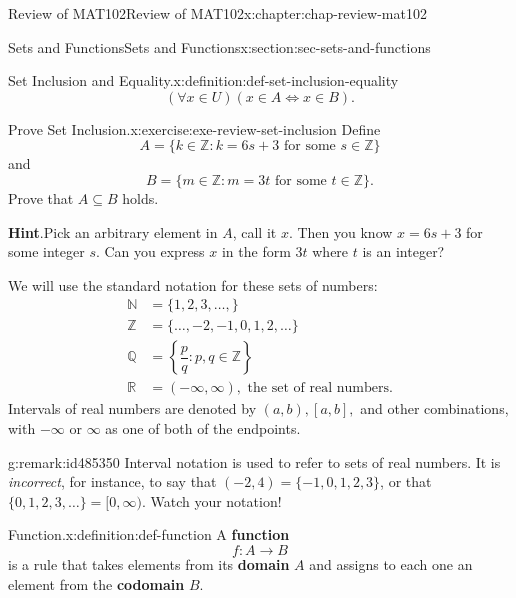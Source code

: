 \documentclass[oneside,10pt,]{book}
\newcommand{\blocktitlefont}{\relax}
\newcommand{\terminology}[1]{\textbf{#1}}
\numberwithin{equation}{section}
\newcommand{\amp}{&}
\begin{document}
\begin{chapterptx}{Review of MAT102}{}{Review of MAT102}{}{}{x:chapter:chap-review-mat102}
\begin{sectionptx}{Sets and Functions}{}{Sets and Functions}{}{}{x:section:sec-sets-and-functions}
\begin{definition}{Set Inclusion and Equality.}{x:definition:def-set-inclusion-equality}
\begin{equation*}
(\forall x \in U)(x \in A \Leftrightarrow x \in B)\text{.}
\end{equation*}
%
\end{definition}
\begin{inlineexercise}{Prove Set Inclusion.}{x:exercise:exe-review-set-inclusion}%
Define%
\begin{equation*}
A = \{k \in \mathbb{Z} : k = 6s + 3 \text{ for some } s \in \mathbb{Z}\}
\end{equation*}
and%
\begin{equation*}
B = \{m \in \mathbb{Z} : m = 3t \text{ for some } t \in \mathbb{Z}\}\text{.}
\end{equation*}
Prove that \(A \subseteq B\) holds.%
\par\smallskip%
\noindent\textbf{\blocktitlefont Hint}.\hypertarget{g:hint:id434538}{}\quad{}Pick an arbitrary element in \(A\), call it \(x\). Then you know \(x = 6s + 3\) for some integer \(s\). Can you express \(x\) in the form \(3t\) where \(t\) is an integer?%
\end{inlineexercise}
We will use the standard notation for these sets of numbers: \label{g:notation:id485277}\label{g:notation:id485297}\label{g:notation:id485271}\label{g:notation:id485331}\label{g:notation:id485339}%
\begin{align*}
\mathbb{N} \amp = \{1,2,3,\ldots,\}\\
\mathbb{Z} \amp = \{\ldots,-2,-1,0,1,2,\ldots\}\\
\mathbb{Q} \amp = \left\{\dfrac{p}{q} : p,q \in \mathbb{Z}\right\}\\
\mathbb{R} \amp = (-\infty,\infty), \text{ the set of real numbers.}
\end{align*}
Intervals of real numbers are denoted by \((a,b), [a,b],\) and other combinations, with \(-\infty\) or \(\infty\) as one of both of the endpoints.%
\begin{remark}{}{g:remark:id485350}%
Interval notation is used to refer to sets of real numbers. It is \emph{incorrect}, for instance, to say that \((-2,4) = \{-1,0,1,2,3\}\), or that \(\{0,1,2,3,\ldots\} = [0,\infty)\). Watch your notation!%
\end{remark}
\begin{definition}{Function.}{x:definition:def-function}%
\label{g:notation:id485343} A \terminology{function}%
\begin{equation*}
f: A \rightarrow B
\end{equation*}
is a rule that takes elements from its \terminology{domain} \(A\) and assigns to each one an element from the \terminology{codomain} \(B\).%

\end{definition}
\end{sectionptx}
\end{chapterptx}
\end{document}
